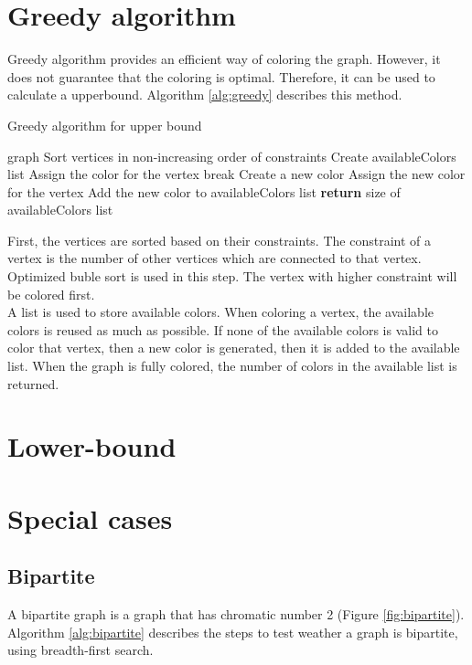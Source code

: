 \documentclass[a4paper]{report}
\begin{document}
		\section{Greedy algorithm}
		Greedy algorithm provides an efficient way of coloring the graph. However,  it does not guarantee that the coloring is optimal. Therefore, it can be used to calculate a upperbound. Algorithm \ref{alg:greedy} describes this method.\\
		\begin{algorithm}
			\caption{Greedy algorithm for upper bound}
			\label{alg:greedy}
			\begin{algorithmic}[1]
				\REQUIRE graph
				\STATE Sort vertices in non-increasing order of constraints
				\STATE Create availableColors list
					\STATE Assign the color for the vertex
					\STATE break
					\ENDIF
					\ENDFOR
					\STATE Create a new color
					\STATE Assign the new color for the vertex
					\STATE Add the new color to availableColors list
					\ENDIF
				\ENDFOR
				\STATE \textbf{return} size of availableColors list
			\end{algorithmic}
		\end{algorithm}
		First, the vertices are sorted based on their constraints. The constraint of a vertex is  the number of other vertices which are connected to that vertex. Optimized buble sort \cite{bubblesort2019} is used in this step. The vertex with higher constraint will be colored first.\\
		A list is used to store available colors. When coloring a vertex, the available colors is reused as much as possible. If none of the available colors is valid to color that vertex, then a new color is generated, then it is added to the available list. When the graph is fully colored, the number of colors in the available list is returned.\\
		
		\section{Lower-bound}
		
		\section{Special cases}
			\subsection{Bipartite}
			A bipartite graph is a graph that has chromatic number 2 (Figure \ref{fig:bipartite}). Algorithm \ref{alg:bipartite} describes the steps to test weather a graph is bipartite, using breadth-first search. \\
			
\end{document}
